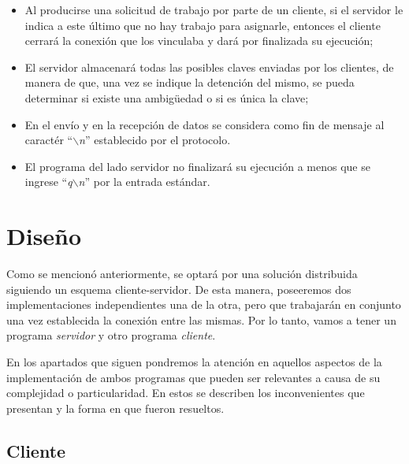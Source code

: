 \documentclass{article}
\begin{document}
\begin{itemize}
	\itemsep=3pt \topsep=0pt \partopsep=0pt \parskip=0pt \parsep=0pt

	\item Al producirse una solicitud de trabajo por parte de un cliente, si el servidor le indica a este último que no hay trabajo para asignarle, entonces el cliente cerrará la conexión que los vinculaba y dará por finalizada su ejecución;

	\item El servidor almacenará todas las posibles claves enviadas por los clientes, de manera de que, una vez se indique la detención del mismo, se pueda determinar si existe una ambig\"uedad o si es única la clave;

	\item En el envío y en la recepción de datos se considera como fin de mensaje al caractér ``\textit{$\backslash$n}'' establecido por el protocolo.

	\item El programa del lado servidor no finalizará su ejecución a menos que se ingrese ``\textit{q$\backslash$n}'' por la entrada estándar.
\end{itemize}
\medskip




\section{Diseño}

	Como se mencionó anteriormente, se optará por una solución distribuida siguiendo un esquema cliente-servidor. De esta manera, poseeremos dos implementaciones independientes una de la otra, pero que trabajarán en conjunto una vez establecida la conexión entre las mismas. Por lo tanto, vamos a tener un programa \textit{servidor} y otro programa \textit{cliente}.
	\par
	En los apartados que siguen pondremos la atención en aquellos aspectos de la implementación de ambos programas que pueden ser relevantes a causa de su complejidad o particularidad. En estos se describen los inconvenientes que presentan y la forma en que fueron resueltos.
\bigskip



\subsection{Cliente}
	
\end{document}
